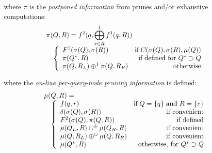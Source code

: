 \documentclass[times, 10pt,twocolumn]{article}
\newcommand{\union}{\cup}
\DeclareMathOperator{\IF}{if}
\newcommand{\muv}{\union^{\oplus}}
\newcommand{\muh}{\oplus^{\union}}
\begin{document}
\noindent where $\pi$ is the {\it postponed information} from prunes and/or exhaustive computations:
\begin{equation}
\label{eqn:pi}
 \begin{array}{ll}
  \lefteqn{\pi(Q, R) = f^{2}(q, \bigoplus^{1}_{r \in R} f^{1}(q, R))}
  \\
  & \left\{
    \begin{array}{lr}
      F^{1}(\sigma(Q), \sigma(R)) & \IF C(\sigma(Q), \sigma(R), \mu(Q))
      \\
      \pi(Q^{*}, R) & \mbox{if defined for } Q^{*} \supset Q
      \\
      \pi(Q, R_L) \oplus^{1} \pi(Q, R_R) & \mbox{otherwise}
    \end{array}
  \right.
 \end{array}
\end{equation}

\noindent where the {\it on-line per-query-node pruning information} is defined:
\begin{equation}
\label{eqn:mu}
 \begin{array}{ll}
  \lefteqn{\mu(Q, R) =}
  \\
  & \left\{
    \begin{array}{lr}
      f(q, r) & \IF Q = \{q\} \mbox{ and } R = \{r\}
      \\
      \delta(\sigma(Q), \sigma(R)) & \mbox{if convenient}
      \\
      F^2(\sigma(Q), \pi(Q, R)) & \mbox{if defined}
      \\
      \mu(Q_L, R) \muv \mu(Q_R, R) & \mbox{if convenient}
      \\
      \mu(Q, R_L) \muh \mu(Q, R_R) & \mbox{if convenient}
      \\
      \mu(Q^{*}, R) & \mbox{otherwise, for } Q^{*} \supset Q
    \end{array}
  \right.
 \end{array}
\end{equation}
\end{document}
